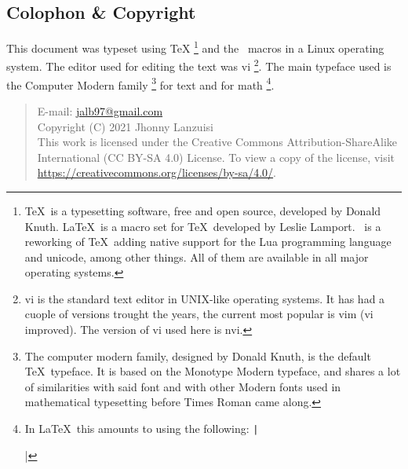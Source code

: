 \newpage
\begin{small}
    \begin{center}
    \begin{minipage}{0.4\paperwidth}
        \section*{Colophon \& Copyright}
        This document was typeset using \TeX%
        \footnote{%
            \TeX\ is
            a typesetting software, free and open source,
            developed by Donald Knuth. \LaTeX\ is a macro
            set for \TeX\ developed by Leslie Lamport. \LuaTeX\ is
            a reworking of \TeX\ adding native support for the Lua
            programming language and unicode, among other things.
            All of them are available in all major
            operating systems.
        }
        and the \LaTeXe\ macros in a Linux operating system.
        The editor used for editing the text was vi%
        \footnote{%
            vi is the standard text editor in UNIX-like
						operating systems. It has had a cuople of versions
						trought the years, the current most popular is vim
						(vi improved). The version of vi used here is
						nvi.
        }.
        The main typeface used is the Computer Modern family%
        \footnote{%
						The computer modern family, designed by Donald Knuth,
						is the default \TeX\ typeface. It is based on the
						Monotype Modern typeface, and shares a lot of similarities
						with said font and with other Modern fonts used in
						mathematical typesetting before Times Roman came along.
        }
        for text and for math%
        \footnote{%
            In \LaTeX\ this amounts to using the following:
            \texttt|\usepackage{crf-lm}|
        }.

        \medskip
        \begin{quote}\ttfamily\raggedright\footnotesize%
            E-mail: \url{jalb97@gmail.com} \\
            Copyright (C) 2021 Jhonny Lanzuisi \\
            This work is licensed under the Creative Commons Attribution-ShareAlike
            International (CC BY-SA 4.0)  License. To view a copy of the license,
            visit \url{https://creativecommons.org/licenses/by-sa/4.0/}.
        \end{quote}
    \end{minipage}
    \end{center}
\end{small}
\newpage
\tableofcontents
